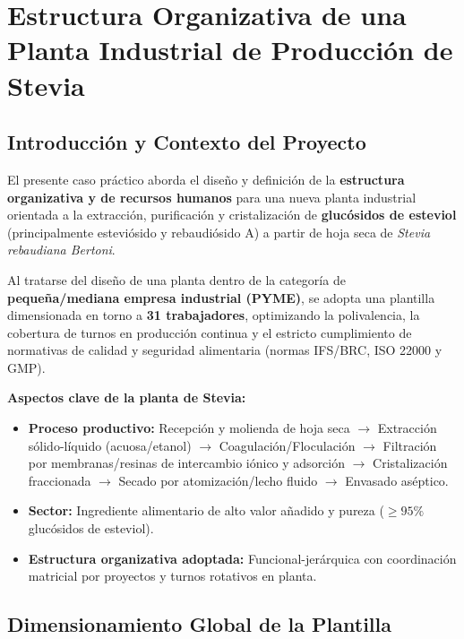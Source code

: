 ﻿\chapter{Estructura Organizativa de una Planta Industrial de Producción de Stevia}

\section{Introducción y Contexto del Proyecto}

El presente caso práctico aborda el diseño y definición de la \textbf{estructura organizativa y de recursos humanos} para una nueva planta industrial orientada a la extracción, purificación y cristalización de \textbf{glucósidos de esteviol} (principalmente esteviósido y rebaudiósido A) a partir de hoja seca de \textit{Stevia rebaudiana Bertoni}.

Al tratarse del diseño de una planta dentro de la categoría de \textbf{pequeña/mediana empresa industrial (PYME)}, se adopta una plantilla dimensionada en torno a \textbf{31 trabajadores}, optimizando la polivalencia, la cobertura de turnos en producción continua y el estricto cumplimiento de normativas de calidad y seguridad alimentaria (normas IFS/BRC, ISO 22000 y GMP).

\begin{note}
    \textbf{Aspectos clave de la planta de Stevia:}
    \begin{itemize}
        \item \textbf{Proceso productivo:} Recepción y molienda de hoja seca $\rightarrow$ Extracción sólido-líquido (acuosa/etanol) $\rightarrow$ Coagulación/Floculación $\rightarrow$ Filtración por membranas/resinas de intercambio iónico y adsorción $\rightarrow$ Cristalización fraccionada $\rightarrow$ Secado por atomización/lecho fluido $\rightarrow$ Envasado aséptico.
        \item \textbf{Sector:} Ingrediente alimentario de alto valor añadido y pureza ($\geq 95\%$ glucósidos de esteviol).
        \item \textbf{Estructura organizativa adoptada:} Funcional-jerárquica con coordinación matricial por proyectos y turnos rotativos en planta.
    \end{itemize}
\end{note}

\section{Dimensionamiento Global de la Plantilla}

